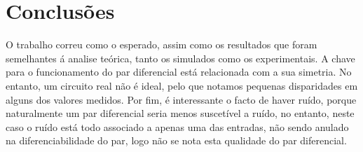 \documentclass[a4paper,9pt]{extarticle}
\begin{document}
	\newpage
	\section{Conclusões}
		O trabalho correu como o esperado, assim como os resultados que foram semelhantes á analise teórica, tanto os simulados como os experimentais.\newline
A chave para o funcionamento do par diferencial está relacionada com a sua simetria. No entanto, um circuito real não é ideal, pelo que notamos pequenas disparidades em alguns dos valores medidos.\newline
Por fim, é interessante o facto de haver ruído, porque naturalmente um par diferencial seria menos suscetível a ruído, no entanto, neste caso o ruído está todo associado a apenas uma das entradas, não sendo anulado na diferenciabilidade do par, logo não se nota esta qualidade do par diferencial.
\end{document}
